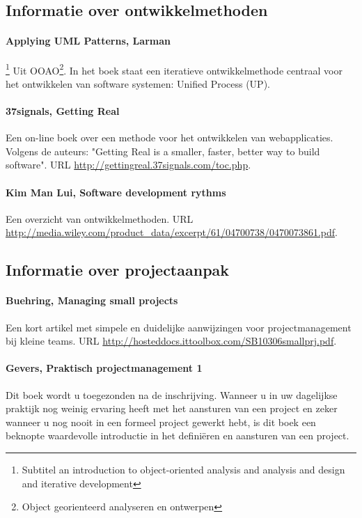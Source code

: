 \subsection{Informatie over ontwikkelmethoden}

\paragraph{Applying UML Patterns, Larman}\footnote{Subtitel an introduction to object-oriented analysis
and analysis and design and iterative development} Uit OOAO\footnote{Object georienteerd
analyseren en ontwerpen}.  In het boek staat een
iteratieve ontwikkelmethode centraal voor het ontwikkelen van software
systemen: Unified Process (UP).
\paragraph{37signals, Getting Real} Een on-line boek over een methode
voor het ontwikkelen van webapplicaties. Volgens de auteurs: "Getting
Real is a smaller, faster, better way to build software". URL \url{http://gettingreal.37signals.com/toc.php}.
\paragraph{Kim Man Lui, Software development rythms} Een overzicht van
ontwikkelmethoden. URL \url{http://media.wiley.com/product_data/excerpt/61/04700738/0470073861.pdf}.

\subsection{Informatie over projectaanpak}

\paragraph{Buehring, Managing small projects}
Een kort artikel met simpele en duidelijke aanwijzingen voor projectmanagement bij kleine teams.
URL \url{http://hosteddocs.ittoolbox.com/SB10306smallprj.pdf}.

\paragraph{Gevers, Praktisch projectmanagement 1} Dit boek wordt u toegezonden
na de inschrijving. Wanneer u in uw dagelijkse praktijk nog weinig ervaring heeft met het
aansturen van een project en zeker wanneer u nog nooit in een formeel project
gewerkt hebt, is dit boek een beknopte waardevolle introductie in het definiëren
en aansturen van een project.

